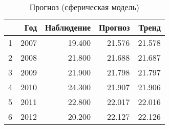 \begin{table}[ht]
\centering
\begin{tabular}{rrrrr}
  \hline
 & Год & Наблюдение & Прогноз & Тренд \\ 
  \hline
1 & 2007 & 19.400 & 21.576 & 21.578 \\ 
  2 & 2008 & 21.800 & 21.688 & 21.687 \\ 
  3 & 2009 & 21.900 & 21.798 & 21.797 \\ 
  4 & 2010 & 24.300 & 21.907 & 21.906 \\ 
  5 & 2011 & 22.800 & 22.017 & 22.016 \\ 
  6 & 2012 & 20.200 & 22.127 & 22.126 \\ 
   \hline
\end{tabular}
\caption{Прогноз (сферическая модель)} 
\label{table:manual-prediction}
\end{table}
